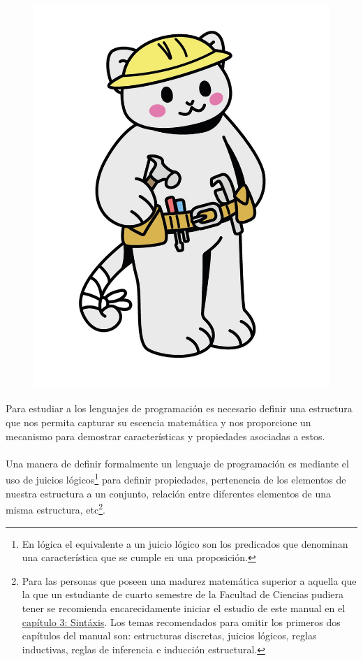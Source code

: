 

\begin{figure}[htbp]
    \centerline{\includegraphics[scale=.19]{assets/02_gatito_herramientas_matematicas.jpg}}
    \label{fig 1. Mapa para clasificar los lenguajes de programación.}        
\end{figure}

Para estudiar a los lenguajes de programación es necesario definir una estructura que nos permita capturar su escencia matemática y nos proporcione un mecanismo para demostrar características y propiedades asociadas a estos. \\\\
Una manera de definir formalmente un lenguaje de programación es mediante el uso de juicios lógicos\footnote{En lógica el equivalente a un juicio lógico son los predicados que denominan una característica que se cumple en una proposición.} para definir propiedades, pertenencia de los elementos de nuestra estructura a un conjunto, relación entre diferentes elementos de una misma estructura, etc\footnote{Para las personas que poseen una madurez matemática superior a aquella que la que un estudiante de cuarto semestre de la Facultad de Ciencias pudiera tener se recomienda encarecidamente iniciar el estudio de este manual en el \hyperref[sec:sintax]{capítulo 3: Sintáxis}. Los temas recomendados para omitir los primeros dos capítulos del manual son: estructuras discretas, juicios lógicos, reglas inductivas, reglas de inferencia e inducción estructural. }. \\
